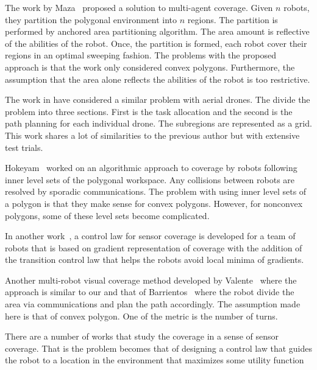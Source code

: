 \documentclass[../main.tex]{subfiles}
\begin{document}
The work by Maza~\cite{maza2007multiple} proposed a solution to multi-agent coverage. Given $n$ robots, they partition the polygonal environment into $n$ regions. The partition is performed by anchored area partitioning algorithm. The area amount is reflective of the abilities of the robot. Once, the partition is formed, each robot cover their regions in an optimal sweeping fashion. The problems with the proposed approach is that the work only considered convex polygons. Furthermore, the assumption that the area alone reflects the abilities of the robot is too restrictive.

The work in \cite{barrientos2011aerial} have considered a similar problem with aerial drones. The divide the problem into three sections. First is the task allocation and the second is the path planning for each individual drone. The subregions are represented as a grid. This work shares a lot of similarities to the previous author but with extensive test trials.

Hokeyam~\cite{hokayem2007dynamic} worked on an algorithmic approach to coverage by robots following inner level sets of the polygonal workspace. Any collisions between robots are resolved by sporadic communications. The problem with using inner level sets of a polygon is that they make sense for convex polygons. However, for nonconvex polygons, some of these level sets become complicated. 

In another work~\cite{atincc2013supervised}, a control law for sensor coverage is developed for a team of robots that is based on gradient representation of coverage with the addition of the transition control law that helps the robots avoid local minima of gradients.

Another multi-robot visual coverage method developed by Valente~\cite{valente2011multi} where the approach is similar to our and that of Barrientos~\cite{barrientos2011aerial} where the robot divide the area via communications and plan the path accordingly. The assumption made here is that of convex polygon. One of the metric is the number of turns.

There are a number of works that study the coverage in a sense of sensor coverage. That is the problem becomes that of designing a control law that guides the robot to a location in the environment that maximizes some utility function
\end{document}
